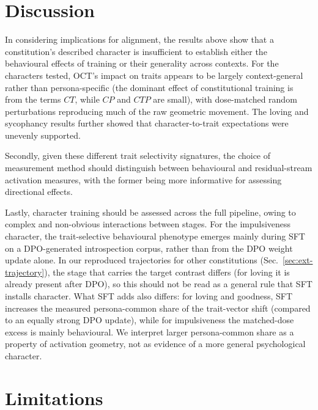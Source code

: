 \documentclass{article}
\begin{document}

\section{Discussion}

In considering implications for alignment, the results above show that a constitution's described character is insufficient to establish either the behavioural effects of training or their generality across contexts. For the characters tested, OCT's impact on traits appears to be largely context-general rather than persona-specific (the dominant effect of constitutional training is from the terms \(CT\), while \(CP\) and \(CTP\) are small), with dose-matched random perturbations reproducing much of the raw geometric movement. The loving and sycophancy results further showed that character-to-trait expectations were unevenly supported. 

Secondly, given these different trait selectivity signatures, the choice of measurement method should distinguish between behavioural and residual-stream activation measures, with the former being more informative for assessing directional effects. 

Lastly, character training should be assessed across the full pipeline, owing to complex and non-obvious interactions between stages. For the impulsiveness character, the trait-selective behavioural phenotype emerges mainly during SFT on a DPO-generated introspection corpus, rather than from the DPO weight update alone. In our reproduced trajectories for other constitutions (Sec.~\ref{sec:ext-trajectory}), the stage that carries the target contrast differs (for loving it is already present after DPO), so this should not be read as a general rule that SFT installs character. What SFT adds also differs: for loving and goodness, SFT increases the measured persona-common share of the trait-vector shift (compared to an equally strong DPO update), while for impulsiveness the matched-dose excess is mainly behavioural. We interpret larger persona-common share as a property of activation geometry, not as evidence of a more general psychological character.

\section*{Limitations}
\label{sec:limit}
\end{document}
